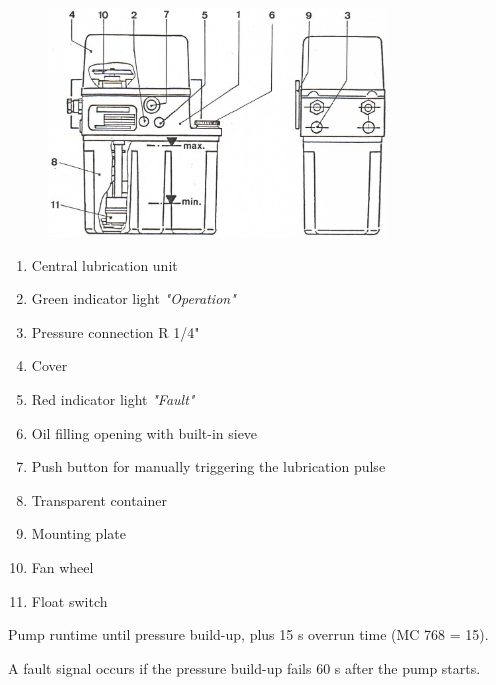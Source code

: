 
\begin{figure}[h]
    \centering
    \includegraphics[width=0.8\textwidth]{images/lubrication_unit.jpg}
\end{figure}

\begin{enumerate}
    \item Central lubrication unit
    \item Green indicator light \textit{"Operation"}
    \item Pressure connection R 1/4"
    \item Cover
    \item Red indicator light \textit{"Fault"}
    \item Oil filling opening with built-in sieve
    \item Push button for manually triggering the lubrication pulse
    \item Transparent container
    \item Mounting plate
    \item Fan wheel
    \item Float switch
\end{enumerate}


\noindent Pump runtime until pressure build-up, plus 15 s overrun time (MC 768 = 15).

\vspace{.3cm}

\noindent A fault signal occurs if the pressure build-up fails 60 s after the pump starts.


